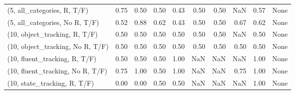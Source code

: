 \begin{table*}[h!]
\begin{adjustbox}{width=2\columnwidth,center}
\begin{tabular}{lrrr|rrr|rrr}
(5, all\_categories, R, T/F)          &                      0.75 &                  0.50 &                      0.50 &                          0.43 &                      0.50 &                          0.50 &                                    NaN &                               0.57 &                                  None \\
(5, all\_categories, No R, T/F)       &                      0.52 &                  0.88 &                      0.62 &                          0.43 &                      0.50 &                          0.50 &                                   0.67 &                               0.62 &                                  None \\



\midrule
(10, object\_tracking, R, T/F)         &                      0.50 &                  0.50 &                      0.50 &                          0.50 &                      0.50 &                          0.50 &                                    NaN &                               0.50 &                                  None \\
(10, object\_tracking, No R, T/F)      &                      0.50 &                  0.50 &                      0.50 &                          0.50 &                      0.50 &                          0.50 &                                   0.50 &                               0.50 &                                  None \\
(10, fluent\_tracking, R, T/F)         &                      0.50 &                  0.50 &                      0.50 &                          1.00 &                       NaN &                           NaN &                                    NaN &                               1.00 &                                  None \\
(10, fluent\_tracking, No R, T/F)      &                      0.75 &                  1.00 &                      0.50 &                          1.00 &                       NaN &                           NaN &                                   0.75 &                               1.00 &                                  None \\
(10, state\_tracking, R, T/F)          &                      0.00 &                  0.00 &                      0.50 &                          0.50 &                       NaN &                           NaN &                                    NaN &                               1.00 &                                  None \\

\end{tabular}
\end{adjustbox}
\end{table*}
